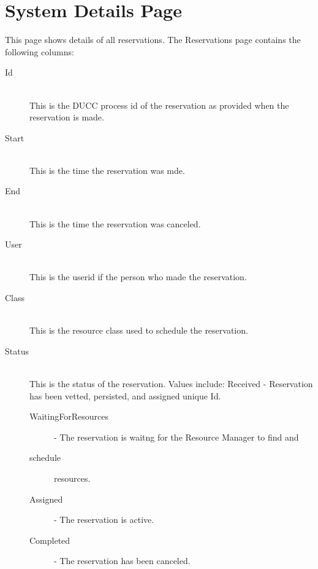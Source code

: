 
    \section{System  Details Page}

        This page shows details of all reservations. The Reservations page contains the following columns: 
        \begin{description}

            \item[Id] \hfill \\
              This is the DUCC process id of the reservation as provided when the reservation is
              made.

            \item[Start] \hfill \\
              This is the time the reservation was mde.
              
            \item[End] \hfill \\
              This is the time the reservation was canceled.
              
            \item[User] \hfill \\
              This is the userid if the person who made the reservation.
              
            \item[Class] \hfill \\
              This is the resource class used to schedule the reservation.
              
            \item[Status] \hfill \\
              This is the status of the reservation. Values include: Received - Reservation
              has been vetted, persisted, and assigned unique Id.
              \begin{description}
                  \item[WaitingForResources] - The reservation is waitng for the Resource Manager to find and 
                  \item[schedule] resources. 
                  \item[Assigned] - The reservation is active. 
                  \item[Completed] - The reservation has been canceled.                     
              \end{description}


\end{description}
